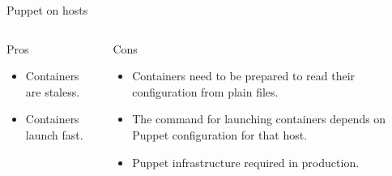 \documentclass[presentation]{beamer}
\begin{document}
{
\begin{frame}[label=sec-6-3]{Puppet on hosts}

\begin{columns}
\begin{column}{0.5\textwidth}
\begin{block}{Pros}

\begin{itemize}
\item Containers are staless.
\item Containers launch fast.
\end{itemize}
\end{block}
\end{column}

\begin{column}{0.5\textwidth}
\begin{block}{Cons}

\begin{itemize}
\item Containers need to be prepared to read their configuration from plain files.
\item The command for launching containers depends on Puppet configuration for that host.
\item Puppet infrastructure required in production.
\end{itemize}
\end{block}
\end{column}
\end{columns}
\end{frame}} %
\end{document}
